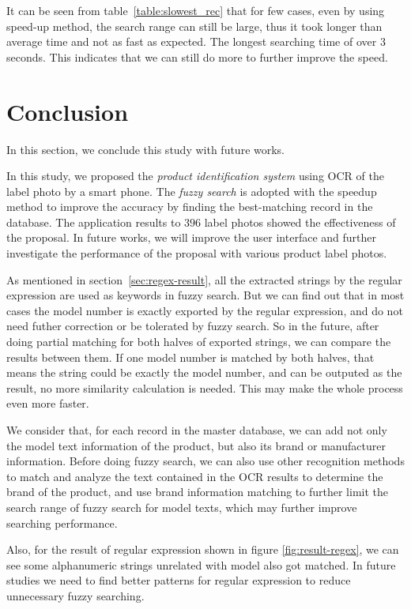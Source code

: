 \documentclass[technicalreport]{ieicej}
\begin{document}
        It can be seen from table~\ref{table:slowest_rec} that for few cases, even by using speed-up method, the search range can still be large, thus it took longer than average time and not as fast as expected. The longest searching time of over $3$ seconds. This indicates that we can still do more to further improve the speed.
               
\section{Conclusion}
\label{sec:conclusion}
    In this section, we conclude this study with future works.

    In this study, we proposed the {\em product identification system} using OCR of the label photo by a smart phone. The {\em fuzzy search} is adopted with the speedup method to improve the accuracy by finding the best-matching record in the database. The application results to $396$ label photos showed the effectiveness of the proposal. In future works, we will improve the user interface and further investigate the performance of the proposal with various product label photos.

    As mentioned in section~\ref{sec:regex-result}, all the extracted strings by the regular expression are used as keywords in fuzzy search. But we can find out that in most cases the model number is exactly exported by the regular expression, and do not need futher correction or be tolerated by fuzzy search. So in the future, after doing partial matching for both halves of exported strings, we can compare the results between them. If one model number is matched by both halves, that means the string could be exactly the model number, and can be outputed as the result, no more similarity calculation is needed. This may make the whole process even more faster.
            
    We consider that, for each record in the master database, we can add not only the model text information of the product, but also its brand or manufacturer information. Before doing fuzzy search, we can also use other recognition methods to match and analyze the text contained in the OCR results to determine the brand of the product, and use brand information matching to further limit the search range of fuzzy search for model texts, which may further improve searching performance.

    Also, for the result of regular expression shown in figure \ref{fig:result-regex}, we can see some alphanumeric strings unrelated with model also got matched. In future studies we need to find better patterns for regular expression to reduce unnecessary fuzzy searching.
\end{document}

